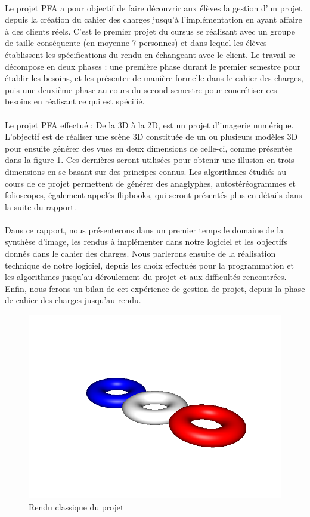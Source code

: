 \paragraph{}
        Le projet PFA a pour objectif de faire découvrir aux élèves la gestion d'un projet depuis la création du cahier des charges jusqu'à l'implémentation en ayant affaire à des clients réels. C'est le premier projet du cursus se réalisant avec un groupe de taille conséquente (en moyenne 7 personnes) et dans lequel les élèves établissent les spécifications du rendu en échangeant avec le client. Le travail se décompose en deux phases : une première phase durant le premier semestre pour établir les besoins, et les présenter de manière formelle dans le cahier des charges, puis une deuxième phase au cours du second semestre pour concrétiser ces besoins en réalisant ce qui est spécifié.

\paragraph{}      
        Le projet PFA effectué : De la 3D à la 2D, est un projet d'imagerie numérique. L'objectif est de réaliser une scène 3D constituée de un ou plusieurs modèles 3D pour ensuite générer des vues en deux dimensions de celle-ci, comme présentée dans la figure \ref{fig:3Don}. Ces dernières seront utilisées pour obtenir une illusion en trois dimensions en se basant sur des principes connus. Les algorithmes étudiés au cours de ce projet permettent de générer des anaglyphes, autostéréogrammes et folioscopes, également appelés flipbooks,  qui seront présentés plus en détails dans la suite du rapport.
        
\paragraph{}
        Dans ce rapport, nous présenterons dans un premier temps le domaine de la synthèse d'image, les rendus à implémenter dans notre logiciel et les objectifs donnés dans le cahier des charges. Nous parlerons ensuite de la réalisation technique de notre logiciel, depuis les choix effectués pour la programmation et les algorithmes jusqu'au déroulement du projet et aux difficultés rencontrées. Enfin, nous ferons un bilan de cet expérience de gestion de projet, depuis la phase de cahier des charges jusqu'au rendu.

\begin{figure}[h]
	\centering
	\includegraphics[scale=0.4]{3donut_rendu.png}
	\caption{\label{fig:3Don} Rendu classique du projet \protect}
\end{figure}
